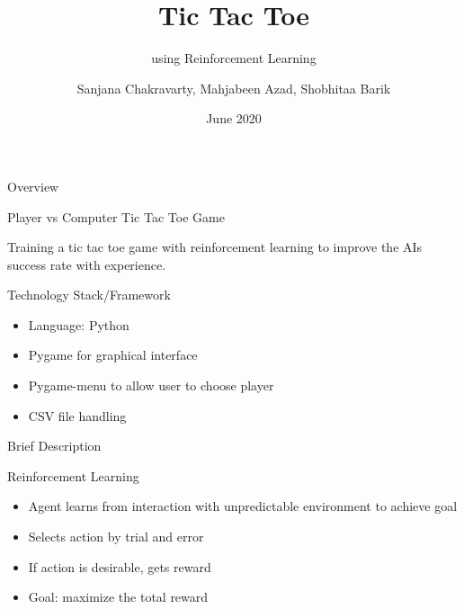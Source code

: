 \documentclass[14pt]{beamer}
\title[WTEF 2020]{Tic Tac Toe}
\subtitle{using Reinforcement Learning}
\author[Group 12]{Sanjana Chakravarty, Mahjabeen Azad, Shobhitaa Barik}
\date{June 2020}
\begin{document}
\begin{frame}
    \titlepage
\end{frame}

\begin{frame}{Overview}
    \begin{center}
        \textcolor{myAmber}{Player vs Computer Tic Tac Toe Game}
    \end{center}
   
    \begin{center}
    Training a tic tac toe game with reinforcement learning to improve the AI\textquotesingle s success rate with experience.
    \end{center}
\end{frame}

\begin{frame}{Technology Stack/Framework}
        \begin{itemize}
            \item Language: Python
            \item Pygame for graphical interface 
            \item Pygame-menu to allow user to choose player
            \item CSV file handling
        \end{itemize}
\end{frame}

\begin{frame}{Brief Description}
    \begin{block}{Reinforcement Learning}        
        \begin{itemize}
            \item<1-> Agent learns from interaction with unpredictable environment to achieve goal
            \item<2-> Selects action by trial and error
            \item<3-> If action is desirable, gets reward
            \item<4-> Goal: maximize the total reward
        \end{itemize}
    \end{block}
\end{frame}
\end{document}
